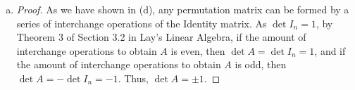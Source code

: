 \documentclass[11pt]{scrartcl}
\theoremstyle{dotlessP}
\theoremstyle{dotlessN}
\begin{document}
\begin{enumerate}[(a)]
\begin{proof}
			By Theorem 7 in Section 2.2 Lay's Linear Algebra, the sequence of elementary row operations that reduces $A$ to $I_n$ also transforms $I_n$ into $A^{-1}$. As we obtain the identity matrix from $A$ by only interchanging rows, we do not affect the property that each column has only 1 element that is 1 and the rest is 0, and each row only has 1 element that is 1 and the rest is 0, and thus the inverse of $A$, $A^{-1}$, is also a permutation matrix.
		\end{proof}
	\item 
		\begin{proof}
			As we have shown in (d), any permutation matrix can be formed by a series of interchange operations of the Identity matrix. As $\det I_n = 1$, by Theorem 3 of Section 3.2 in Lay's Linear Algebra, if the amount of interchange operations to obtain $A$ is even, then  $\det A = \det I_n = 1$, and if the amount of interchange operations to obtain $A$ is odd, then $\det A = -\det I_n = -1$. Thus, $\det A = \pm 1$.
		\end{proof}
\end{enumerate}
\end{document}
